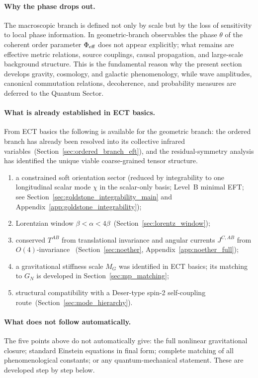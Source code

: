 \documentclass[11pt,a4paper]{article}
\numberwithin{equation}{section}
\begin{document}
\paragraph{Why the phase drops out.}
The macroscopic branch is defined not only by scale but by
the loss of sensitivity to local phase information.
In geometric-branch observables the phase $\theta$ of the
coherent order parameter $\Phi_{\rm eff}$ does not appear
explicitly; what remains are effective metric relations,
source couplings, causal propagation, and large-scale
background structure.
This is the fundamental reason why the present section develops
gravity, cosmology, and galactic phenomenology, while wave
amplitudes, canonical commutation relations, decoherence, and
probability measures are deferred to the Quantum Sector.

\paragraph{What is already established in ECT basics.}
From ECT basics the following is available for the geometric branch:
the ordered branch has already been resolved into its collective
infrared variables~(Section~\ref{sec:ordered_branch_eft}), and the
residual-symmetry analysis has identified the unique viable
coarse-grained tensor structure.
\begin{enumerate}[label=(\roman*)]
  \item a constrained soft orientation sector (reduced by integrability
    to one longitudinal scalar mode $\chi$ in the scalar-only basis;
    Level~B minimal EFT; see Section~\ref{sec:goldstone_integrability_main}
    and Appendix~\ref{app:goldstone_integrability});
  \item Lorentzian window $\beta<\alpha<4\beta$~(Section~\ref{sec:lorentz_window});
  \item conserved $T^{AB}$ from translational invariance
    and angular currents $J^{C,AB}$ from $O(4)$-invariance
    ~(Section~\ref{sec:noether}, Appendix~\ref{app:noether_full});
  \item a gravitational stiffness scale $M_G$ was identified in ECT
    basics; its matching to $G_N$ is developed in Section~\ref{sec:mp_matching};
  \item structural compatibility with a Deser-type spin-2
    self-coupling route~(Section~\ref{sec:mode_hierarchy}).
\end{enumerate}

\paragraph{What does not follow automatically.}
The five points above do not automatically give:
the full nonlinear gravitational closure;
standard Einstein equations in final form;
complete matching of all phenomenological constants;
or any quantum-mechanical statement.
These are developed step by step below.
\end{document}
